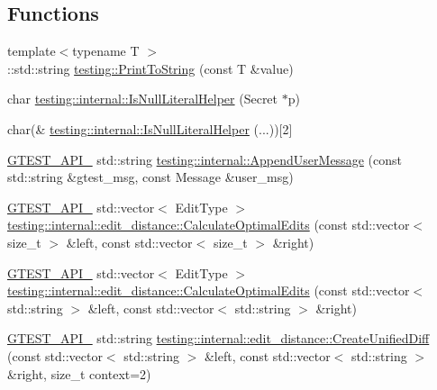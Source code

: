\subsection*{Functions}
\begin{DoxyCompactItemize}
\item 
{\footnotesize template$<$typename T $>$ }\\\+::std\+::string \hyperlink{namespacetesting_aa5717bb1144edd1d262d310ba70c82ed}{testing\+::\+Print\+To\+String} (const T \&value)
\item 
char \hyperlink{namespacetesting_1_1internal_afb0731ba39ffef1fa1730ac0699c9025}{testing\+::internal\+::\+Is\+Null\+Literal\+Helper} (Secret $\ast$p)
\item 
char(\& \hyperlink{namespacetesting_1_1internal_ab53ecfa1632a871ce7c692d722a75a57}{testing\+::internal\+::\+Is\+Null\+Literal\+Helper} (...))\mbox{[}2\mbox{]}
\item 
\hyperlink{gtest-port_8h_aa73be6f0ba4a7456180a94904ce17790}{G\+T\+E\+S\+T\+\_\+\+A\+P\+I\+\_\+} std\+::string \hyperlink{namespacetesting_1_1internal_ae475a090bca903bb222dd389eb189166}{testing\+::internal\+::\+Append\+User\+Message} (const std\+::string \&gtest\+\_\+msg, const Message \&user\+\_\+msg)
\item 
\hyperlink{gtest-port_8h_aa73be6f0ba4a7456180a94904ce17790}{G\+T\+E\+S\+T\+\_\+\+A\+P\+I\+\_\+} std\+::vector$<$ Edit\+Type $>$ \hyperlink{namespacetesting_1_1internal_1_1edit__distance_a26323b4c2a29ea8e187aafbd4d2275db}{testing\+::internal\+::edit\+\_\+distance\+::\+Calculate\+Optimal\+Edits} (const std\+::vector$<$ size\+\_\+t $>$ \&left, const std\+::vector$<$ size\+\_\+t $>$ \&right)
\item 
\hyperlink{gtest-port_8h_aa73be6f0ba4a7456180a94904ce17790}{G\+T\+E\+S\+T\+\_\+\+A\+P\+I\+\_\+} std\+::vector$<$ Edit\+Type $>$ \hyperlink{namespacetesting_1_1internal_1_1edit__distance_a32267b2ae24de1de175ac8217406877d}{testing\+::internal\+::edit\+\_\+distance\+::\+Calculate\+Optimal\+Edits} (const std\+::vector$<$ std\+::string $>$ \&left, const std\+::vector$<$ std\+::string $>$ \&right)
\item 
\hyperlink{gtest-port_8h_aa73be6f0ba4a7456180a94904ce17790}{G\+T\+E\+S\+T\+\_\+\+A\+P\+I\+\_\+} std\+::string \hyperlink{namespacetesting_1_1internal_1_1edit__distance_ac4c24a581ff433d7aca7ed12c9133fb1}{testing\+::internal\+::edit\+\_\+distance\+::\+Create\+Unified\+Diff} (const std\+::vector$<$ std\+::string $>$ \&left, const std\+::vector$<$ std\+::string $>$ \&right, size\+\_\+t context=2)
\item 

\end{DoxyCompactItemize}
